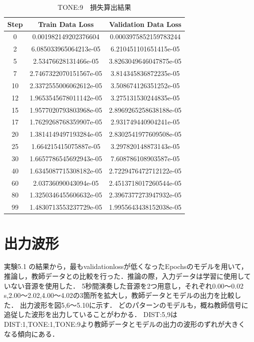 \documentclass{jreport}		%
\begin{document}
\begin{table}
  \begin{center}
  \caption{TONE:9　損失算出結果}
  \begin{tabular}{c|cc} \hline
Step&Train Data Loss&Validation Data Loss \\ \hline
0&0.001982149202376604&0.0003975852159783244 \\
2&6.085033965064213e-05&6.210451101651415e-05 \\
5&2.53476628131466e-05&3.8263049646047875e-05 \\
7&2.7467322070151567e-05&3.814345836872235e-05 \\
10&2.3372555006062612e-05&3.508674126351252e-05 \\
12&1.9653545678011142e-05&3.275131530244835e-05 \\
15&1.9577020793803968e-05&2.8969265258638188e-05 \\
17&1.7629268768359907e-05&2.931749440904241e-05 \\
20&1.3814149497193284e-05&2.8302541977609508e-05 \\
25&1.664215415075887e-05&3.297820148873143e-05 \\
30&1.6657786545692943e-05&7.608786108903587e-05 \\
40&1.6345087715308182e-05&2.7229476472712122e-05 \\
60&2.03736090043094e-05&2.4513718017260544e-05 \\
80&1.3250346455606632e-05&2.3967377273947932e-05 \\
99&1.4830713553237729e-05&1.9955643438152038e-05 \\ \hline
  \end{tabular}
  \end{center}
\end{table}

\section{出力波形}
実験5.1 の結果から，最もvalidationlossが低くなったEpochsのモデルを用いて，推論し，教師データとの比較を行った．推論の際，入力データは学習に使用していない音源を使用した．
5秒間演奏した音源を2つ用意し，それぞれ0.00～0.02 s,2.00～2.02,4.00～4.02の3箇所を拡大し，教師データとモデルの出力を比較した．
出力波形を図5,6～5.10に示す．
どのパターンのモデルも，概ね教師信号に追従した波形を出力していることがわかる．
DIST:5,9はDIST:1,TONE:1,TONE:9より教師データとモデルの出力の波形のずれが大きくなる傾向にある．
\end{document}
